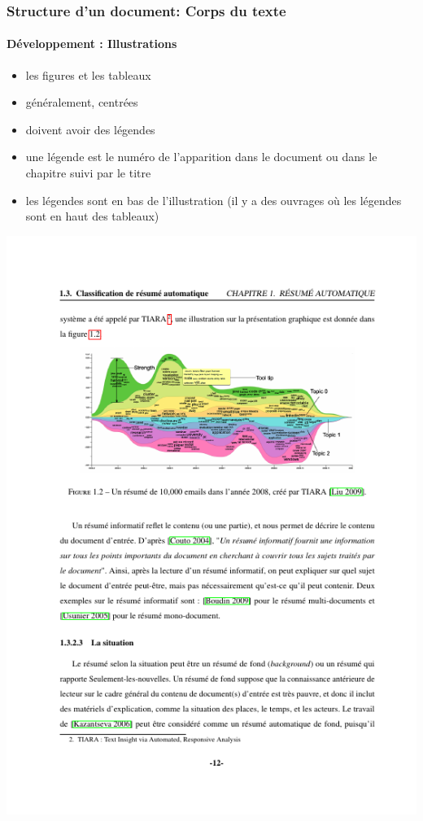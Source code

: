 \documentclass[xcolor=table]{beamer}
\begin{document}
\begin{frame}
\frametitle{Structure d'un document: Corps du texte}
\framesubtitle{Développement : Illustrations}

\begin{minipage}{0.52\textwidth}
	\begin{itemize}
		\item les figures et les tableaux
		\item généralement, centrées 
		\item doivent avoir des légendes 
		\item une légende est le numéro de l'apparition dans le document ou dans le chapitre suivi par le titre
		\item les légendes sont en bas de l'illustration (il y a des ouvrages où les légendes sont en haut des tableaux)
		
	\end{itemize}
\end{minipage}
\begin{minipage}{0.42\textwidth}
	\includegraphics[width=\textwidth]{..//img/Bweb03-redaction/dev.png}
\end{minipage}

\end{frame}
\end{document}
